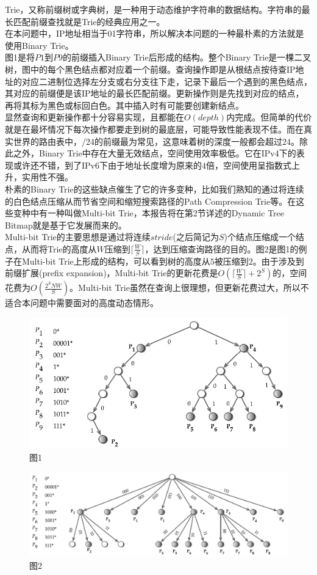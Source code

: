 Trie，又称前缀树或字典树，是一种用于动态维护字符串的数据结构。字符串的最长匹配前缀查找就是Trie的经典应用之一。\\
\indent
在本问题中，IP地址相当于01字符串，所以解决本问题的一种最朴素的方法就是使用Binary Trie。\\
\indent
图1是将$P1$到$P9$的前缀插入Binary Trie后形成的结构。整个Binary Trie是一棵二叉树，图中的每个黑色结点都对应着一个前缀。查询操作即是从根结点按待查IP地址的对应二进制位选择左分支或右分支往下走，记录下最后一个遇到的黑色结点，其对应的前缀便是该IP地址的最长匹配前缀。更新操作则是先找到对应的结点，再将其标为黑色或标回白色。其中插入时有可能要创建新结点。\\
\indent
显然查询和更新操作都十分容易实现，且都能在$O(depth)$内完成。但简单的代价就是在最坏情况下每次操作都要走到树的最底层，可能导致性能表现不佳。而在真实世界的路由表中，/24的前缀最为常见，这意味着树的深度一般都会超过$24$。除此之外，Binary Trie中存在大量无效结点，空间使用效率极低。它在IPv4下的表现或许还不错，到了IPv6下由于地址长度增为原来的$4$倍，空间使用呈指数式上升，实用性不强。\\
\indent
朴素的Binary Trie的这些缺点催生了它的许多变种，比如我们熟知的通过将连续的白色结点压缩从而节省空间和缩短搜索路径的Path Compression Trie等。在这些变种中有一种叫做Multi-bit Trie，本报告将在第2节详述的Dynamic Tree Bitmap就是基于它发展而来的。\\
\indent
Multi-bit Trie的主要思想是通过将连续$stride$(之后简记为$S$)个结点压缩成一个结点，从而将Trie的高度从$W$压缩到$\lceil\frac{W}{S}\rceil$，达到压缩查询路径的目的。图2是图1的例子在Multi-bit Trie上形成的结构，可以看到树的高度从$5$被压缩到$2$。由于涉及到前缀扩展(prefix expansion)，Multi-bit Trie的更新花费是$O(\lceil\frac{W}{S}\rceil + 2^{S})$的，空间花费为$O(\frac{2^{S}NW}{S})$。Multi-bit Trie虽然在查询上很理想，但更新花费过大，所以不适合本问题中需要面对的高度动态情形。\\

\begin{figure}[h!]
\centering
\includegraphics[scale=0.4]{trie.png}
\caption{图1}
\end{figure}

\begin{figure}[h!]
\centering
\includegraphics[scale=0.4]{mbt.png}
\caption{图2}
\end{figure}

\clearpage
